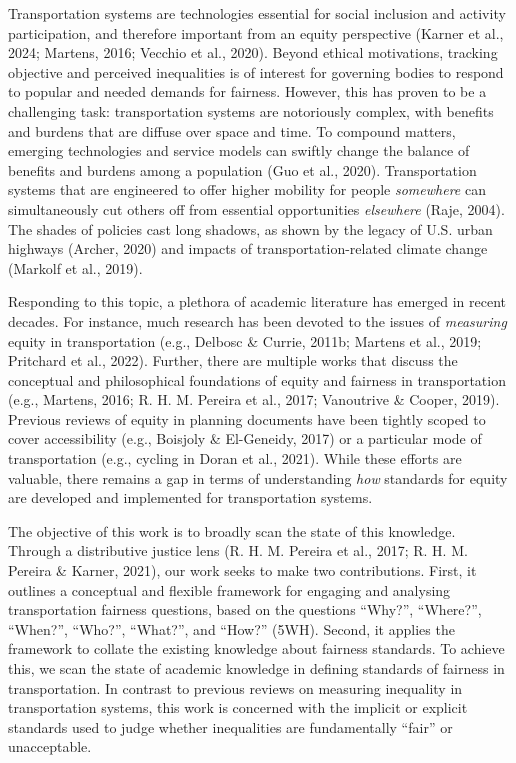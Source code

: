 \documentclass[
  letterpaper,
  DIV=11,
  numbers=noendperiod]{scrartcl}
\begin{document}
Transportation systems are technologies essential for social inclusion
and activity participation, and therefore important from an equity
perspective (Karner et al., 2024; Martens, 2016; Vecchio et al., 2020).
Beyond ethical motivations, tracking objective and perceived
inequalities is of interest for governing bodies to respond to popular
and needed demands for fairness. However, this has proven to be a
challenging task: transportation systems are notoriously complex, with
benefits and burdens that are diffuse over space and time. To compound
matters, emerging technologies and service models can swiftly change the
balance of benefits and burdens among a population (Guo et al., 2020).
Transportation systems that are engineered to offer higher mobility for
people \emph{somewhere} can simultaneously cut others off from essential
opportunities \emph{elsewhere} (Raje, 2004). The shades of policies cast
long shadows, as shown by the legacy of U.S. urban highways (Archer,
2020) and impacts of transportation-related climate change (Markolf et
al., 2019).

Responding to this topic, a plethora of academic literature has emerged
in recent decades. For instance, much research has been devoted to the
issues of \emph{measuring} equity in transportation (e.g., Delbosc \&
Currie, 2011b; Martens et al., 2019; Pritchard et al., 2022). Further,
there are multiple works that discuss the conceptual and philosophical
foundations of equity and fairness in transportation (e.g., Martens,
2016; R. H. M. Pereira et al., 2017; Vanoutrive \& Cooper, 2019).
Previous reviews of equity in planning documents have been tightly
scoped to cover accessibility (e.g., Boisjoly \& El-Geneidy, 2017) or a
particular mode of transportation (e.g., cycling in Doran et al., 2021).
While these efforts are valuable, there remains a gap in terms of
understanding \emph{how} standards for equity are developed and
implemented for transportation systems.

The objective of this work is to broadly scan the state of this
knowledge. Through a distributive justice lens (R. H. M. Pereira et al.,
2017; R. H. M. Pereira \& Karner, 2021), our work seeks to make two
contributions. First, it outlines a conceptual and flexible framework
for engaging and analysing transportation fairness questions, based on
the questions ``Why?'', ``Where?'', ``When?'', ``Who?'', ``What?'', and
``How?'' (5WH). Second, it applies the framework to collate the existing
knowledge about fairness standards. To achieve this, we scan the state
of academic knowledge in defining standards of fairness in
transportation. In contrast to previous reviews on measuring inequality
in transportation systems, this work is concerned with the implicit or
explicit standards used to judge whether inequalities are fundamentally
``fair'' or unacceptable.
\end{document}
